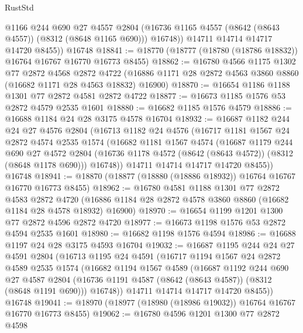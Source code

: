\begin{lexlean}{RustStd}
\begin{coremodule}
            @1166
            @244
            @690
            @27
            @4557
            @2804
            (@16736 @1165 @4557 (@8642 (@8643 @4557)) (@8312 (@8648 @1165 @690)))
            @16748))
        @14711
        @14714
        @14717
        @14720
        @8455))
    @16748
@18841 := @18770 (@18777 (@18780 (@18786 @18832)) @16764 @16767 @16770 @16773 @8455)
@18862 := @16780
    @4566
    @1175
    @1302
    @77
    @2872
    @4568
    @2872
    @4722
    (@16886 @1171 @28 @2872 @4563 @3860 @8860 (@16682 @1171 @28 @4563 @18832) @16900)
@18870 := @16654 @1186 @1188 @1301 @77 @2872 @4581 @2872 @4722
@18877 := @16673 @1185 @1576 @53 @2872 @4579 @2535 @1601
@18880 := @16682 @1185 @1576 @4579
@18886 := @16688 @1184 @24 @28 @3175 @4578 @16704
@18932 := @16687
    @1182
    @244
    @24
    @27
    @4576
    @2804
    (@16713
      @1182
      @24
      @4576
      (@16717
        @1181
        @1567
        @24
        @2872
        @4574
        @2535
        @1574
        (@16682
          @1181
          @1567
          @4574
          (@16687
            @1179
            @244
            @690
            @27
            @4572
            @2804
            (@16736 @1178 @4572 (@8642 (@8643 @4572)) (@8312 (@8648 @1178 @690)))
            @16748))
        @14711
        @14714
        @14717
        @14720
        @8455))
    @16748
@18941 := @18870 (@18877 (@18880 (@18886 @18932)) @16764 @16767 @16770 @16773 @8455)
@18962 := @16780
    @4581
    @1188
    @1301
    @77
    @2872
    @4583
    @2872
    @4720
    (@16886 @1184 @28 @2872 @4578 @3860 @8860 (@16682 @1184 @28 @4578 @18932) @16900)
@18970 := @16654 @1199 @1201 @1300 @77 @2872 @4596 @2872 @4720
@18977 := @16673 @1198 @1576 @53 @2872 @4594 @2535 @1601
@18980 := @16682 @1198 @1576 @4594
@18986 := @16688 @1197 @24 @28 @3175 @4593 @16704
@19032 := @16687
    @1195
    @244
    @24
    @27
    @4591
    @2804
    (@16713
      @1195
      @24
      @4591
      (@16717
        @1194
        @1567
        @24
        @2872
        @4589
        @2535
        @1574
        (@16682
          @1194
          @1567
          @4589
          (@16687
            @1192
            @244
            @690
            @27
            @4587
            @2804
            (@16736 @1191 @4587 (@8642 (@8643 @4587)) (@8312 (@8648 @1191 @690)))
            @16748))
        @14711
        @14714
        @14717
        @14720
        @8455))
    @16748
@19041 := @18970 (@18977 (@18980 (@18986 @19032)) @16764 @16767 @16770 @16773 @8455)
@19062 := @16780
    @4596
    @1201
    @1300
    @77
    @2872
    @4598

\end{coremodule}
\end{lexlean}
